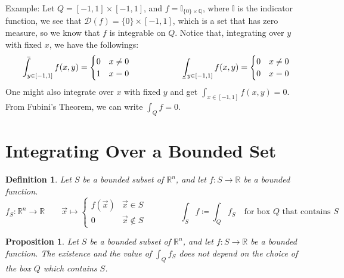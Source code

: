 \documentclass[15pt]{book}
\theoremstyle{break}
\theoremstyle{break}
\newtheorem{prop}[lem]{Proposition}
\newtheorem{defn}{Definition}[corL]
\def\upint{\mathchoice%
    {\mkern13mu\overline{\vphantom{\intop}\mkern7mu}\mkern-20mu}%
    {\mkern7mu\overline{\vphantom{\intop}\mkern7mu}\mkern-14mu}%
    {\mkern7mu\overline{\vphantom{\intop}\mkern7mu}\mkern-14mu}%
    {\mkern7mu\overline{\vphantom{\intop}\mkern7mu}\mkern-14mu}%
  \int}
\def\lowint{\mkern3mu\underline{\vphantom{\intop}\mkern7mu}\mkern-10mu\int}
\newcommand{\R}{\mathbb{R}}
\newcommand{\Q}{\mathbb{Q}}
\newcommand{\D}{\mathcal{D}}
\newcommand{\example}{\color{green}Example: \color{black}}
\begin{document}
\example Let $Q = [-1,1] \times [-1,1]$, and $f = \mathbb{I}_{\{0\} \times \Q}$, where $\mathbb{I}$ is the indicator function, we see that $\D(f) = \{0\} \times [-1,1]$, which is a set that has zero measure, so we know that $f$ is integrable on $Q$. Notice that, integrating over $y$ with fixed $x$, we have the followings:
$$\upint_{y \in [-1,1]} f(x,y)  = \begin{cases} 
0& x\neq 0 \\ 1 & x = 0
\end{cases} \qquad \qquad \qquad \lowint_{y \in [-1,1]} f(x,y) = \begin{cases} 0 & x \neq 0 \\ 0 & x= 0 \end{cases}$$
One might also integrate over $x$ with fixed $y$ and get $\int_{x \in [-1,1]} f(x,y) = 0$. From Fubini's Theorem, we can write $\int_Q f = 0$. \\




\newpage
\section[Integrating Over a Bounded Set]{\color{red} Integrating Over a Bounded Set \color{black}}


\begin{defn}
Let $S$ be a bounded subset of $\R^n$, and let $f:S \to \R$ be a bounded function.
$$f_S : \R^n \to \R \qquad \vec{x}\mapsto \begin{cases}f(\vec{x}) & \vec{x} \in S \\ 0 &\vec{x}\notin S\end{cases} \qquad \qquad\int_S f \coloneqq \int_Q f_S \quad \text{for box } Q \text{ that contains }S$$
\end{defn}

\begin{prop}
Let $S$ be a bounded subset of $\R^n$, and let $f:S \to \R$ be a bounded function. The existence and the value of $\int_Q f_S$ does not depend on the choice of the box $Q$ which contains $S$.
\end{prop}
\end{document}
